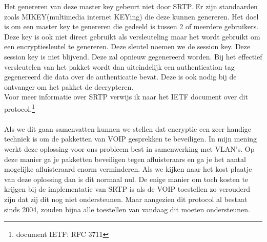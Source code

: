 \documentclass[pdftex,a4paper,12pt,twoside]{report}
\begin{document}
Het genereren van deze master key gebeurt niet door SRTP. Er zijn standaarden zoals MIKEY(multimedia internet KEYing) die deze kunnen genereren. Het doel is om een master key te genereren die gedeeld is tussen 2 of meerdere gebruikers. Deze key is ook niet direct gebruikt als versleuteling maar het wordt gebruikt om een encryptiesleutel te genereren. Deze sleutel noemen we de session key. Deze session key is niet blijvend. Deze zal opnieuw gegenereerd worden. Bij het effectief versleutelen van het pakket wordt dan uiteindelijk een authentication tag gegenereerd die data over de authenticatie bevat. Deze is ook nodig bij de ontvanger om het pakket de decrypteren. \\ Voor meer informatie over SRTP verwijs ik naar het IETF document over dit protocol.\footnote{document IETF: RFC 3711}
\\ \\
Als we dit gaan samenvatten kunnen we stellen dat encryptie een zeer handige techniek is om de pakketten van VOIP gesprekken te beveiligen. In mijn mening werkt deze oplossing voor ons probleem best in samenwerking met VLAN's. Op deze manier ga je pakketten beveiligen tegen afluisteraars en ga je het aantal mogelijke afluisteraard enorm verminderen. Als we kijken naar het kost plaatje van deze oplossing dan is dit normaal nul. De enige manier om toch kosten te krijgen bij de implementatie van SRTP is als de VOIP toestellen zo verouderd zijn dat zij dit nog niet ondersteunen. Maar aangezien dit protocol al bestaat sinds 2004, zouden bijna alle toestellen van vandaag dit moeten ondersteunen.


\newpage
\end{document}
